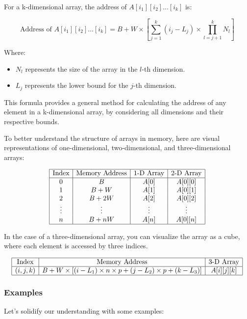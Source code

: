 \documentclass{book}
\begin{document}
For a k-dimensional array, the address of \( A[i_1][i_2] \dots [i_k] \) is:

\[
\text{Address of } A[i_1][i_2] \dots [i_k] = B + W \times \left[ \sum_{j=1}^{k} (i_j - L_j) \times \prod_{l=j+1}^{k} N_l \right]
\]

Where:
\begin{itemize}
	\item \( N_l \) represents the size of the array in the \( l \)-th dimension.
	\item \( L_j \) represents the lower bound for the \( j \)-th dimension.
\end{itemize}

This formula provides a general method for calculating the address of any element in a k-dimensional array, by considering all dimensions and their respective bounds.

To better understand the structure of arrays in memory, here are visual representations of one-dimensional, two-dimensional, and three-dimensional arrays:

\[
\begin{array}{|c|c|c|c|}
	\hline
	\text{Index} & \text{Memory Address} & \text{1-D Array} & \text{2-D Array} \\
	\hline
	0 & B & A[0] & A[0][0] \\
	1 & B + W & A[1] & A[0][1] \\
	2 & B + 2W & A[2] & A[0][2] \\
	\vdots & \vdots & \vdots & \vdots \\
	n & B + nW & A[n] & A[0][n] \\
	\hline
\end{array}
\]

In the case of a three-dimensional array, you can visualize the array as a cube, where each element is accessed by three indices.

\[
\begin{array}{|c|c|c|}
	\hline
	\text{Index} & \text{Memory Address} & \text{3-D Array} \\
	\hline
	(i, j, k) & B + W \times \left[ (i - L_1) \times n \times p + (j - L_2) \times p + (k - L_3) \right] & A[i][j][k] \\
	\hline
\end{array}
\]

\subsubsection{Examples}

Let’s solidify our understanding with some examples:
\end{document}
